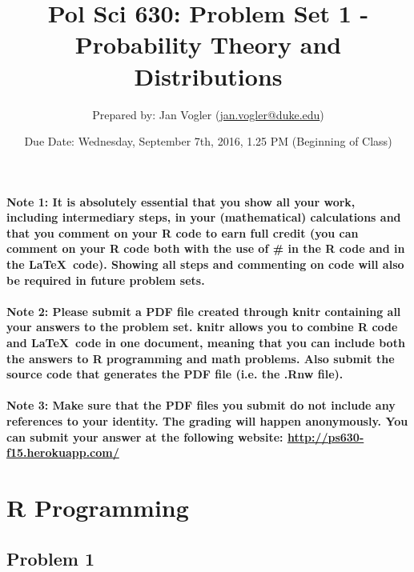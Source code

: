 \documentclass[12pt,letter]{article}
\begin{document}
\title{Pol Sci 630: Problem Set 1 - Probability Theory and Distributions}

\author{Prepared by: Jan Vogler (\href{mailto:jan.vogler@duke.edu}{jan.vogler@duke.edu})}

\date{Due Date: Wednesday, September 7th, 2016, 1.25 PM (Beginning of Class)}
 
\maketitle 



\paragraph{Note 1: It is absolutely essential that you show all your work, including intermediary steps, in your (mathematical) calculations and that you comment on your R code to earn full credit (you can comment on your R code both with the use of \# in the R code and in the \LaTeX \ code). Showing all steps and commenting on code will also be required in future problem sets.}

\paragraph{Note 2: Please submit a PDF file created through knitr containing all your answers to the problem set. knitr allows you to combine R code and \LaTeX \ code in one document, meaning that you can include both the answers to R programming and math problems. Also submit the source code that generates the PDF file (i.e. the .Rnw file).}

\paragraph{Note 3: Make sure that the PDF files you submit do not include any references to your identity. The grading will happen anonymously. You can submit your answer at the following website: \url{http://ps630-f15.herokuapp.com/}}



\section*{R Programming}

\subsection*{Problem 1}
\end{document}
